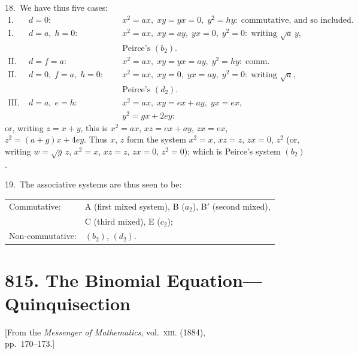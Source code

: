 \documentclass[11pt,a4paper]{article}
\theoremstyle{plain}
\theoremstyle{definition}
\theoremstyle{remark}
\begin{document}
18.~We have thus five cases:
\begin{align*}
\text{I.(a)}\;& d=0:\;\; && x^2=ax,\; xy=yx=0,\; y^2=hy:\;\text{commutative, and so included.}\\
\text{I.(b)}\;& d=a,\; h=0:\;\; && x^2=ax,\; xy=ay,\; yx=0,\; y^2=0:\;\text{writing }\sqrt{a}\,y,\\
&&&\text{Peirce's $(b_2)$.}\\
\text{II.(c)}\;& d=f=a:\;\; && x^2=ax,\; xy=yx=ay,\; y^2=hy:\;\text{comm.}\\
\text{II.(d)}\;& d=0,\; f=a,\; h=0:\;\; && x^2=ax,\; xy=0,\; yx=ay,\; y^2=0:\;\text{writing }\sqrt{a},\\
&&&\text{Peirce's $(d_2)$.}\\
\text{III.(e)}\;& d=a,\; e=h:\;\; && x^2=ax,\; xy=ex+ay,\; yx=ex,\\
&&& y^2=gx+2ey:
\end{align*}
or, writing $z=x+y$, this is $x^2=ax$, $xz=ex+ay$, $zx=ex$, $z^2=(a+g)x+4ey$. Thus $x$, $z$ form the system $x^2=x$, $xz=z$, $zx=0$, $z^2$ (or, writing $w=\sqrt{g}\,z$, $x^2=x$, $xz=z$, $zx=0$, $z^2=0$); which is Peirce's system $(b_2)$.

19.~The associative systems are thus seen to be:
\begin{center}
\begin{tabular}{ll}
Commutative: & A (first mixed system), B ($a_2$), B$'$ (second mixed), \\
& C (third mixed), E ($c_2$);\\[0.3em]
Non-commutative: & $(b_2)$, $(d_2)$.
\end{tabular}
\end{center}

\medskip



\newpage
\section*{815. The Binomial Equation---Quinquisection}

\begin{center}
\small[From the \textit{Messenger of Mathematics}, vol.~\textsc{xiii}. (1884),\\
pp.~170--173.]
\end{center}
\end{document}
